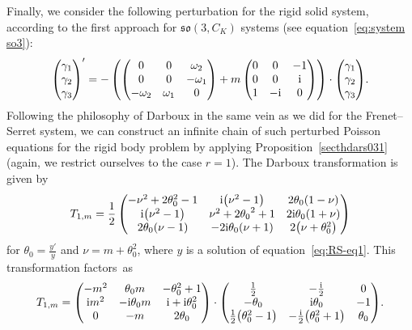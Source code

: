 \documentclass[10pt,a4paper]{amsart}
\numberwithin{equation}{section}
\begin{document}
Finally, we consider the following perturbation for the rigid solid system, according to the first approach for $\mathfrak{so}(3, C_K)$ systems (see
	equation~\eqref{eq:system so3}):
\begin{gather*}
\begin{pmatrix} \gamma_1 \\ \gamma_2 \\ \gamma_3 \end{pmatrix}' = - \left (\begin{pmatrix}
0 & 0 & \omega_2 \\ 0 & 0 & - \omega_1 \\ -\omega_2 & \omega_1 & 0 \end{pmatrix} + m \begin{pmatrix} 0 & 0 & -1 \\ 0 & 0 & {\rm i} \\ 1 & -{\rm i} & 0 \end{pmatrix} \right ) \cdot
\begin{pmatrix} \gamma_1 \\ \gamma_2 \\ \gamma_3 \end{pmatrix}\! .
\end{gather*}
Following the philosophy of Darboux in the same vein as we did for the Frenet--Serret system, we can construct an infinite chain of such perturbed Poisson equations for the rigid body problem by applying Proposition~\ref{secthdars031} (again, we restrict ourselves to the case $r=1$). The Darboux transformation is given by
\begin{gather*}
T_{1,m} = \frac{1}{2} \begin{pmatrix}
-{\nu}^{2} + 2 \theta_0 ^{2} -1 & {\rm i} \big({\nu}^{2} -1\big) & 2\theta_0 (1 - \nu) \\
 {\rm i} \big({\nu}^{2} -1\big) &{\nu}^{2}+ 2{\theta_0 }^{2}+1 & 2 {\rm i} \theta_0 (1 +\nu) \\
 2 \theta_0 (\nu -1) &-2 {\rm i} \theta_0 (\nu +1) & 2 \big(\nu + \theta_0 ^2\big)
 \end{pmatrix}
\end{gather*}
for $\theta_0 = \frac{y'}{y}$ and $\nu=m + \theta_0 ^2$, where $y$ is a solution of equation~\eqref{eq:RS-eq1}.
This transformation factors~as
\begin{gather*}
T_{1,m} = \begin{pmatrix}
-m^2 & \theta_0 m & - \theta_0^2 +1 \\ {\rm i}m^2 & -{\rm i} \theta_0 m & {\rm i} + {\rm i} \theta_0^2 \\ 0 & -m & 2\theta_0 \end{pmatrix} \cdot \begin{pmatrix} \frac{1}{2} & - \frac{\rm i}{2} & 0 \\ -\theta_0 & {\rm i} \theta_0 & -1 \\ \frac{1}{2} \big(\theta_0^2 -1\big) & - \frac{\rm i}{2} \big(\theta_0^2 +1\big) & \theta_0
\end{pmatrix}\!.
\end{gather*}
\end{document}
